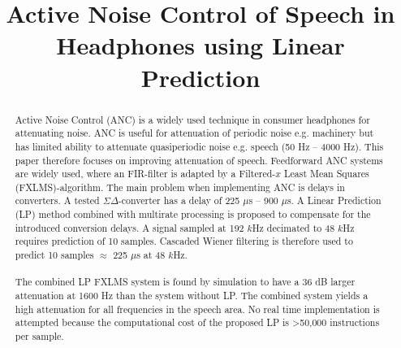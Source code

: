 \documentclass[conference]{IEEEtran}
\begin{document}
\title{Active Noise Control of Speech in Headphones using Linear Prediction}

\author{
}

\maketitle

\begin{abstract}
Active Noise Control (ANC) is a widely used technique in consumer headphones for attenuating noise. ANC is useful for attenuation of periodic noise e.g. machinery but has limited ability to attenuate quasiperiodic noise e.g. speech (50 Hz -- 4000 Hz). This paper therefore focuses on improving attenuation of speech. Feedforward ANC systems are widely used, where an FIR-filter is adapted by a Filtered-$x$ Least Mean Squares (FXLMS)-algorithm. The main problem when implementing ANC is delays in converters. A tested $\Sigma\Delta$-converter has a delay of 225 $\mu$s -- 900 $\mu$s. A Linear Prediction (LP) method combined with multirate processing is proposed to compensate for the introduced conversion delays. A signal sampled at 192 $k$Hz decimated to 48 $k$Hz requires prediction of 10 samples.   Cascaded Wiener filtering is therefore used to predict 10 samples $\approx$ 225 $\mu$s at 48 $k$Hz. 
\\\\
The combined LP FXLMS system is found by simulation to have a 36 dB larger attenuation at 1600 Hz than the system without LP. The combined system yields a high attenuation for all frequencies in the speech area. No real time implementation is attempted because the computational cost of the proposed LP is >50,000 instructions per sample. %
	

\end{abstract}
\end{document}
